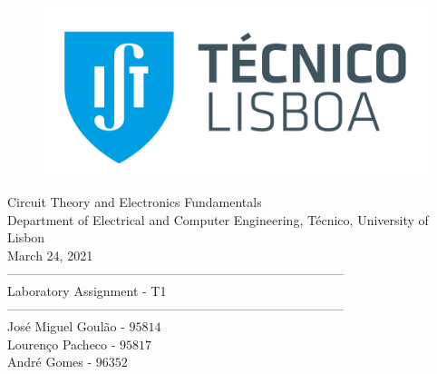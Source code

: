 \thispagestyle {empty}


\begin{figure}[h]
	\centering
	\includegraphics[width = 0.5\linewidth]{ist_foto}
\end{figure}


\begin{center}

\vspace{2cm}
{\FontLb Circuit Theory and Electronics Fundamentals} \\

\vspace{0.5cm}
{\FontSn Department of Electrical and Computer Engineering, Técnico, University of Lisbon} \\

\vspace{0.5cm}
{\FontSn March 24, 2021} \\

\vspace{1cm}
{\FontSn --------------------------------------------------------------------------------} \\
\vspace{0.1cm}
{\FontLb Laboratory Assignment - T1} \\
{\FontSn --------------------------------------------------------------------------------} \\

\vspace{1cm}
{\FontSn José Miguel Goulão - $95814$} \\
{\FontSn Lourenço Pacheco - $95817$} \\
{\FontSn André Gomes - $96352$} \\

\vspace{2cm}

\end{center}


